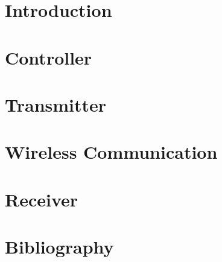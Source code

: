 \documentclass{article}
\begin{document}
	
	\newpage
	
	\tableofcontents
	\setcounter{page}{0}
	\newpage
	
	\section{Introduction}
	
	\newpage
	
	\section{Controller}
	
	\newpage
	
	\section{Transmitter}
	
	\newpage
	
	\section{Wireless Communication}
	
	\newpage
	
	\section{Receiver}
	
	\newpage
	
	\section{Bibliography}
	
	\newpage
	
	
\end{document}
